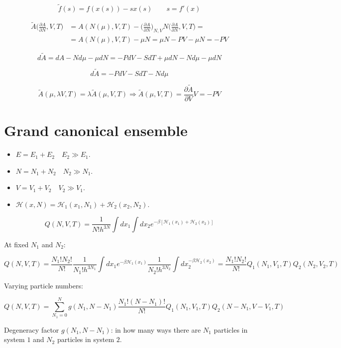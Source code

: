 	$$\tilde{f}(s) = f(x(s))-sx(s)\qquad s = f'(x)$$

	\begin{align*}
		\tilde{A}\biggl(\frac{\partial A}{\partial N}, V, T\biggr) &= A(N(\mu), V, T)-\biggl(\frac{\partial A}{\partial N}\biggr)_{N, V}N\biggl(\frac{\partial A}{\partial N}, V, T\biggr) = \\
																															 &=A(N(\mu), V, T) - \mu N = \mu N - PV - \mu N = -PV
	\end{align*}

	$$d\tilde{A} = dA - Nd \mu -\mu dN = -PdV - SdT + \mu dN -Nd\mu - \mu dN$$

	$$d\tilde{A} = -PdV - SdT - Nd\mu$$

	$$\tilde{A}(\mu, \lambda V, T) = \lambda\tilde{A}(\mu, V, T)\Rightarrow \tilde{A}(\mu, V, T) = \frac{\partial \tilde{A}}{\partial V}V = -PV$$

\section{Grand canonical ensemble}

\begin{multicols}{2}
	\begin{itemize}
		\item $E = E_1 + E_2\quad E_2\gg E_1$.
		\item $N = N_1 + N_2\quad N_2\gg N_1$.
		\item $V = V_1 + V_2\quad V_2\gg V_1$.
		\item $\mathcal{H}(x, N) = \mathcal{H}_1(x_1, N_1) + \mathcal{H}_2(x_2, N_2)$.
	\end{itemize}
\end{multicols}

$$Q(N, V, T) = \frac{1}{N!h^{3N}}\int dx_1\int dx_2e^{-\beta[\mathcal{H}_1(x_1) + \mathcal{H}_2(x_2)]}$$

At fixed $N_1$ and $N_2$:

$$Q(N, V, T) = \frac{N_1!N_2!}{N!}\frac{1}{N_1!h^{3N_1}}\int dx_1 e^{-\beta\mathcal{H}_1(x_1)}\frac{1}{N_2!h^{3N_2}}\int dx_2^{-\beta\mathcal{H}_2(x_2)} = \frac{N_1!N_2!}{N!}Q_1(N_1, V_1, T)Q_2(N_2, V_2, T)$$

Varying particle numbers:

$$Q(N, V, T) = \sum\limits_{N_1=0}^Ng(N_1, N-N_1)\frac{N_1!(N-N_1)!}{N!}Q_1(N_1, V_1, T)Q_2(N-N_1, V-V_1, T)$$

Degeneracy factor $g(N_1, N-N_1)$: in how many ways there are $N_1$ particles in system $1$ and $N_2$ particles in system $2$.

